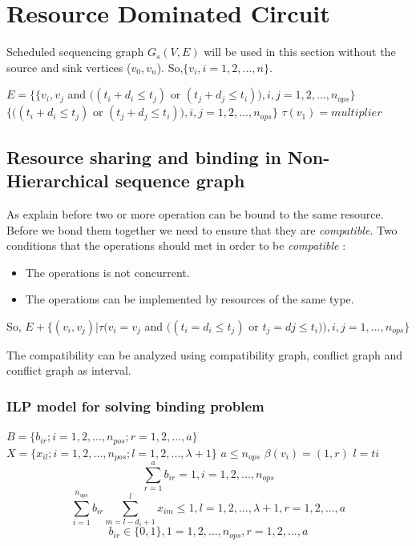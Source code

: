 

\section{Resource Dominated Circuit}

Scheduled sequencing graph $G_{s}(V, E) $ will be used in this section without the source and sink vertices ($ v_{0},v_{n} $). So,$\{v_{i}, i = 1, 2, ... ,n\} $. 



$ E=\{\{v_{i},v_{j} $ and $ ((t_{i}+d_{i}\leq t_{j}) $ or $ (t_{j}+d_{j}\leq t_{i})),i,j=1,2,...,n_{ops}\} $
$ \{((t_{i}+d_{i}\leq t_{j}) $ or $ (t_{j}+d_{j}\leq t_{i})),i,j=1,2,...,n_{ops}\}$
$ \tau(v_{1})= multiplier $

\subsection{Resource sharing and binding in Non-Hierarchical sequence graph}

As explain before two or more operation can be bound to the same resource. Before we bond them together we need to ensure that they are \textit{compatible}. Two conditions that the operations should met in order to be \textit{compatible} :

\begin{itemize}
\item The operations is not concurrent.
\item The operations can be implemented by resources of the same type.
\end{itemize}

So, $ E+\{(v_{i},v_{j})|\tau(v_{i}=v_{j} $ and $ ((t_{i}=d_{i} \leq t_{j}) $ or $ t_{j}=d{j} \leq t_{i})),i,j=1,...,n_{ops}\}$ %






The compatibility can be analyzed using compatibility graph, conflict graph and conflict graph as interval.




\subsubsection{ILP model for solving binding problem}
$ B=\{b_{ir};i=1,2,...,n_{pos};r=1,2,...,a\} $
$ X=\{x_{il};i=1,2,...,n_{pos};l=1,2,...,\lambda+1\} $
$ a\leq n_{ops} $
$ \beta(v_{i})=(1,r) $
$ l = t{i} $
$$ \sum_{r=1}^{a} b_{ir} = 1, i=1,2,...,n_{ops} $$
$$ \sum_{i=1}^{n_{ops}} b_{ir}\sum_{m=l-d_{i}+1}^{l} x_{im} \leq 1, l=1,2,...,\lambda + 1, r=1,2,...,a $$
$$ b_{ir} \in \{0,1\}, 1 =1,2,...,n_{ops}, r=1,2,...,a $$


